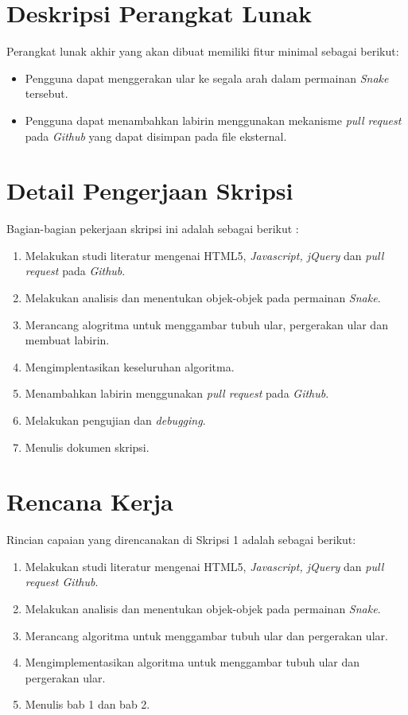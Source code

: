 \documentclass[a4paper,twoside]{article}
\begin{document}
\section{Deskripsi Perangkat Lunak}
Perangkat lunak akhir yang akan dibuat memiliki fitur minimal sebagai berikut:
\begin{itemize}
	\item Pengguna dapat menggerakan ular ke segala arah dalam permainan \textit{Snake} tersebut. 
	\item Pengguna dapat menambahkan labirin menggunakan mekanisme \textit{pull request} pada \textit{Github} yang dapat disimpan pada file eksternal.
\end{itemize}

\section{Detail Pengerjaan Skripsi}
Bagian-bagian pekerjaan skripsi ini adalah sebagai berikut :
	\begin{enumerate}
		\item Melakukan studi literatur mengenai HTML5, \textit{Javascript, jQuery} dan \textit{pull request} pada \textit{Github}.
		\item Melakukan analisis dan menentukan objek-objek pada permainan \textit{Snake}.
		\item Merancang alogritma untuk menggambar tubuh ular, pergerakan ular dan membuat labirin.
		\item Mengimplentasikan keseluruhan algoritma.
		\item Menambahkan labirin menggunakan \textit{pull request} pada \textit{Github}.
		\item Melakukan pengujian dan \textit{debugging}.
		\item Menulis dokumen skripsi.
	\end{enumerate}

\section{Rencana Kerja}
Rincian capaian yang direncanakan di Skripsi 1 adalah sebagai berikut:
\begin{enumerate}
\item Melakukan studi literatur mengenai HTML5, \textit{Javascript, jQuery} dan \textit{pull request Github}.
\item Melakukan analisis dan menentukan objek-objek pada permainan \textit{Snake}.
\item Merancang algoritma untuk menggambar tubuh ular dan pergerakan ular.
\item Mengimplementasikan algoritma untuk menggambar tubuh ular dan pergerakan ular.
\item Menulis bab 1 dan bab 2.
\end{enumerate}
\end{document}
